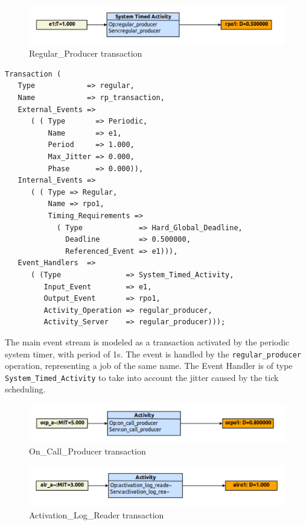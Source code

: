 \documentclass{article}
\begin{document}
\begin{figure}[!htbp]
\centering
\includegraphics[width=5in]{images/transaction-rp}
\caption{Regular\_Producer transaction}
\label{transaction-rp}
\end{figure}

\begin{lstlisting}
Transaction (
   Type            => regular,
   Name            => rp_transaction,
   External_Events =>
      ( ( Type       => Periodic,
          Name       => e1,
          Period     => 1.000,
          Max_Jitter => 0.000,
          Phase      => 0.000)),
   Internal_Events =>
      ( ( Type => Regular,
          Name => rpo1,
          Timing_Requirements =>
            ( Type             => Hard_Global_Deadline,
              Deadline         => 0.500000,
              Referenced_Event => e1))),
   Event_Handlers  =>
      ( (Type               => System_Timed_Activity,
         Input_Event        => e1,
         Output_Event       => rpo1,
         Activity_Operation => regular_producer,
         Activity_Server    => regular_producer)));
\end{lstlisting}

The main event stream is modeled as a transaction activated by the periodic system timer, with period of 1s. The event is handled by the \texttt{regular\_producer} operation, representing a job of the same name. The Event Handler is of type \texttt{System\_Timed\_Activity} to take into account the jitter caused by the tick scheduling.

\begin{figure}[!htbp]
\centering
\includegraphics[width=5in]{images/transaction-ocp}
\caption{On\_Call\_Producer transaction}
\label{transaction-ocp}
\end{figure}

\begin{figure}[!htbp]
\centering
\includegraphics[width=5in]{images/transaction-alr}
\caption{Activation\_Log\_Reader transaction}
\label{transaction-alr}
\end{figure}
\end{document}
